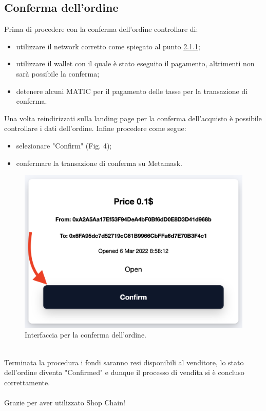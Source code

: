 \documentclass[a4paper, 12pt]{article}
\begin{document}
\subsection{Conferma dell'ordine}
Prima di procedere con la conferma dell'ordine controllare di:
\begin{itemize}
\item utilizzare il network corretto come spiegato al punto \hyperref[sec:network]{2.1.1};
\item utilizzare il wallet con il quale è stato eseguito il pagamento, altrimenti non sarà possibile la conferma;
\item detenere alcuni MATIC per il pagamento delle tasse per la transazione di conferma.
\end{itemize}
Una volta reindirizzati sulla landing page per la conferma dell'acquisto è possibile controllare i dati dell'ordine. Infine procedere come segue:
\begin{itemize}
\item selezionare "Confirm" (Fig. 4);
\item confermare la transazione di conferma su Metamask.
\end{itemize}
\FloatBarrier
\begin{figure}[!h]
\centering
\includegraphics[width=0.5\linewidth]{img/conferma_ordine.png}
\caption{Interfaccia per la conferma dell'ordine.}
\end{figure}
\FloatBarrier
\mbox{}\\
Terminata la procedura i fondi saranno resi disponibili al venditore, lo stato dell'ordine diventa "Confirmed" e dunque il processo di vendita si è concluso correttamente.
\\ \\
Grazie per aver utilizzato Shop Chain!
\end{document}
